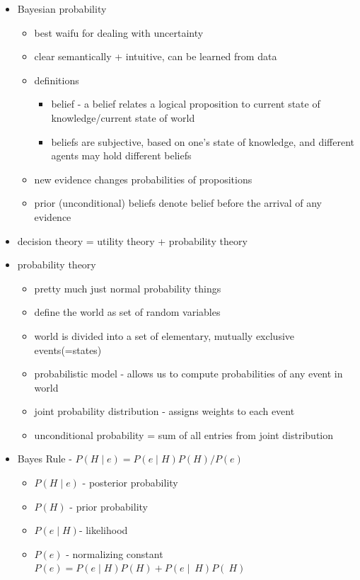 \documentclass[11pt]{article}
\newcommand{\ee}[1]{\ensuremath{#1}}
\begin{document}
\begin{description}
\begin{itemize}
\begin{itemize}
\begin{itemize}
\begin{itemize}
			\end{itemize}
		\end{itemize}
	
		\item Bayesian probability
		\begin{itemize}
			\item best waifu for dealing with uncertainty
			\item clear semantically + intuitive, can be learned from data
			\item definitions
			\begin{itemize}
				\item belief - a belief relates a logical proposition to current state of knowledge/current state of world
				\item beliefs are subjective, based on one's state of knowledge, and different agents may hold different beliefs
			\end{itemize}
		
			\item new evidence changes probabilities of propositions
			
			\item prior (unconditional) beliefs denote belief before the arrival of any evidence
			
		\end{itemize}
	
		\item decision theory = utility theory + probability theory

		\item probability theory
		\begin{itemize}
			\item pretty much just normal probability things
			\item define the world as set of random variables
			\item world is divided into a set of elementary, mutually exclusive events(=states)
			\item probabilistic model - allows us to compute probabilities of any event in world
			\item joint probability distribution - assigns weights to each event
			\item unconditional probability = sum of all entries from joint distribution
		\end{itemize}
	
		\item Bayes Rule - \ee{P(H \mid e) = P(e \mid H) P(H)/P(e)}
		\begin{itemize}
			\item \ee{P(H\mid e)} - posterior probability
			\item \ee{P(H)} - prior probability
			\item \ee{P(e\mid H) }- likelihood
			\item \ee{P(e)} - normalizing constant
			\subitem \ee{P(e) = P(e \mid H) P(H) + P(e \mid ~H) P(~H)}
		\end{itemize}
		

\end{itemize}
\end{itemize}
\end{description}
\end{document}
